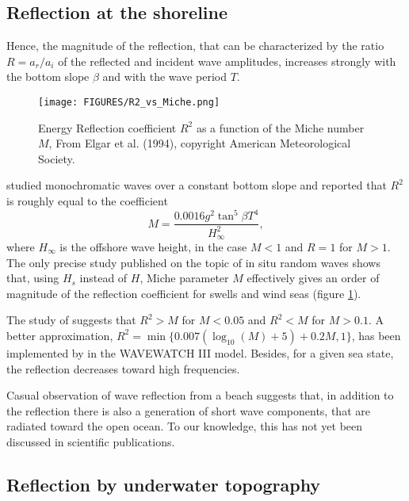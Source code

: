 \subsection{Reflection at the shoreline}
Hence, the magnitude of the reflection, that can be characterized by the ratio $R=a_r/a_i$ of the reflected and incident wave amplitudes, increases
strongly with the bottom slope $\beta$ and with the wave period $T$. 
\begin{figure}[htb]
\centerline{\texttt{[image: FIGURES/R2\_vs\_Miche.png]}}
  \caption{Energy Reflection coefficient $R^2$ as a function of the Miche number $M$, From Elgar et al. (1994), copyright American Meteorological Society.}
\label{fig:Miche_ref}
\end{figure}
\cite{Miche1951} studied monochromatic waves over a constant bottom slope
and reported that $R^2$ is roughly equal to the coefficient
\begin{equation}
M=\frac{0.0016 g^2 \tan^5 \beta  T^4}{H_{\infty}^2},
\end{equation}
where  $H_{\infty}$ is the offshore wave height, in the case $M < 1$ and $R=1$ for $M > 1$. 
The only precise study published on the topic of in situ random waves shows that, using $H_s$ instead of $H$, Miche parameter $M$
effectively gives an order of magnitude of the reflection coefficient for swells and wind seas (figure \ref{fig:Miche_ref}). 


The study of \cite{Elgar&al.1994} suggests that $R^2 > M$ for $M<0.05$ and $R^2 < M$ for $M>0.1$.
A better approximation, $R^2=\min\{0.007(\log_{10}(M)+5)+0.2 M,1\}$, has been implemented by \cite{Ardhuin&Roland2012} in the WAVEWATCH III model.
Besides, for a given sea state, the reflection decreases toward high frequencies. 

Casual observation of wave reflection from a beach suggests that, in addition to the reflection there is also a generation of short wave components, that 
are radiated toward the open ocean. To our knowledge, this has not yet been discussed in scientific publications. 


\subsection{Reflection by underwater topography}

